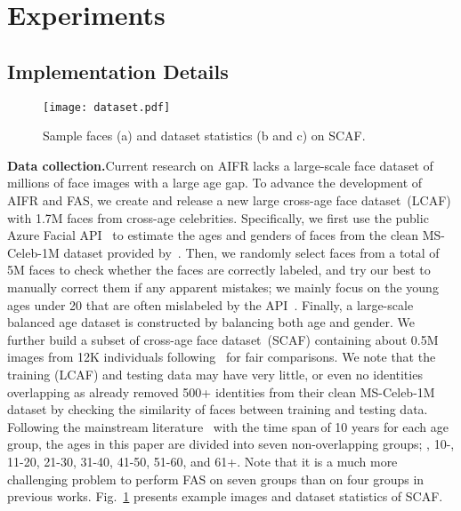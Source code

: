 \section{Experiments}\label{sec:exp}

\subsection{Implementation Details}

\begin{figure}[t]
    \centering
    \texttt{[image: dataset.pdf]}
    \caption{
        Sample faces (a) and dataset statistics (b and c) on SCAF.
    }
    \label{fig:dataset}
    \vspace{-4mm}
\end{figure}

\noindent\textbf{Data collection.}\quad Current research on AIFR lacks a large-scale face dataset of millions of face images with a large age gap. To advance the development of AIFR and FAS, we create and release a new large cross-age face dataset~(LCAF) with 1.7M faces from cross-age celebrities. Specifically, we first use the public Azure Facial API~\cite{azure} to estimate the ages and genders of faces from the clean MS-Celeb-1M dataset provided by~\cite{deng2019arcface}. Then, we randomly select faces from a total of 5M faces to check whether the faces are correctly labeled, and try our best to manually correct them if any apparent mistakes; we mainly focus on the young ages under 20 that are often mislabeled by the API~\cite{azure}. Finally, a large-scale balanced age dataset is constructed by balancing both age and gender. We further build a subset of cross-age face dataset~(SCAF) containing about 0.5M images from 12K individuals following~\cite{wang2019decorrelated,wang2018orthogonal} for fair comparisons. We note that the training (LCAF) and testing data may have very little, or even no identities overlapping as \cite{deng2019arcface} already removed 500+ identities from their clean MS-Celeb-1M dataset by checking the similarity of faces between training and testing data. Following the mainstream literature~\cite{he2019s2gan,lihierarchical,li2019age,liu2019attribute,yang2018learning} with the time span of 10 years for each age group, the ages in this paper are divided into seven non-overlapping groups; \ie, 10-, 11-20, 21-30, 31-40, 41-50, 51-60, and 61+. Note that it is a much more challenging problem to perform FAS on seven groups than on four groups in previous works. Fig.~\ref{fig:dataset} presents example images and dataset statistics of SCAF. 

